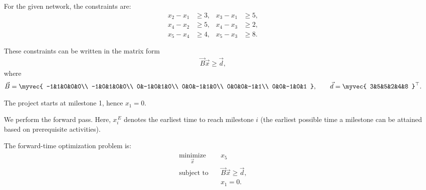 \begin{enumerate}[label=\thesubsection.\arabic*, ref=\thesubsection.\theenumi,itemsep=0pt]
For the given network, the constraints are:
\begin{align}
x_2-x_1&\ge3, &
x_3-x_1&\ge5,\\
x_4-x_2&\ge5, &
x_4-x_3&\ge2,\\
x_5-x_4&\ge4, &
x_5-x_3&\ge8.
\end{align}

These constraints can be written in the matrix form
\begin{align}
\vec{B}\vec{x}\ge\vec{d},
\end{align}
where
\begin{align}
\vec{B}
=
\myvec{
-1&1&0&0&0\\
-1&0&1&0&0\\
0&-1&0&1&0\\
0&0&-1&1&0\\
0&0&0&-1&1\\
0&0&-1&0&1
},
\qquad
\vec{d}
=
\myvec{
3&5&5&2&4&8
}^{\top}.
\end{align}

The project starts at milestone 1, hence $x_1=0$.

We perform the forward pass. Here, $x_i^{\,E}$ denotes the earliest time to reach milestone $i$ (the earliest possible time a milestone can be attained based on prerequisite activities).

The forward-time optimization problem is:
\begin{align}
\begin{aligned}
\underset{\vec{x}}{\operatorname{minimize}}\quad
&x_5\\
\text{subject to}\quad
&\vec{B}\vec{x}\ge\vec{d},\\
&x_1=0.
\end{aligned}
\end{align}


\end{enumerate}
